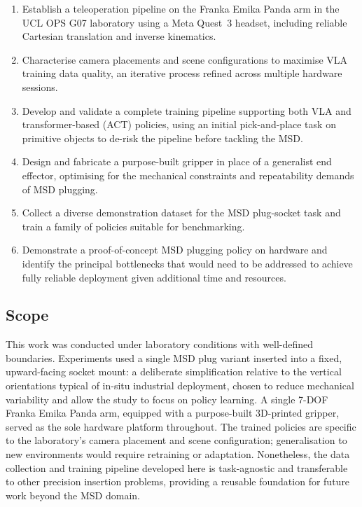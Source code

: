 \documentclass[conference]{IEEEtran}
\begin{document}
\begin{enumerate}
    \item Establish a teleoperation pipeline on the Franka Emika Panda arm in the UCL OPS G07 laboratory using a Meta Quest~3 headset, including reliable Cartesian translation and inverse kinematics.

    \item Characterise camera placements and scene configurations to maximise VLA training data quality, an iterative process refined across multiple hardware sessions.

    \item Develop and validate a complete training pipeline supporting both VLA and transformer-based (ACT) policies, using an initial pick-and-place task on primitive objects to de-risk the pipeline before tackling the MSD.

    \item Design and fabricate a purpose-built gripper in place of a generalist end effector, optimising for the mechanical constraints and repeatability demands of MSD plugging.

    \item Collect a diverse demonstration dataset for the MSD plug-socket task and train a family of policies suitable for benchmarking.

    \item Demonstrate a proof-of-concept MSD plugging policy on hardware and identify the principal bottlenecks that would need to be addressed to achieve fully reliable deployment given additional time and resources.
\end{enumerate}


\subsection{Scope}

This work was conducted under laboratory conditions with well-defined boundaries.
Experiments used a single MSD plug variant inserted into a fixed, upward-facing socket mount: a deliberate simplification relative to the vertical orientations typical of in-situ industrial deployment, chosen to reduce mechanical variability and allow the study to focus on policy learning. A single 7-DOF Franka Emika Panda arm, equipped with a purpose-built 3D-printed gripper, served as the sole hardware platform throughout. The trained policies are specific to the laboratory's camera placement and scene configuration; generalisation to new environments would require retraining or adaptation. Nonetheless, the data collection and training pipeline developed here is task-agnostic and transferable to other precision insertion problems, providing a reusable foundation for future work beyond the MSD domain.
\end{document}

